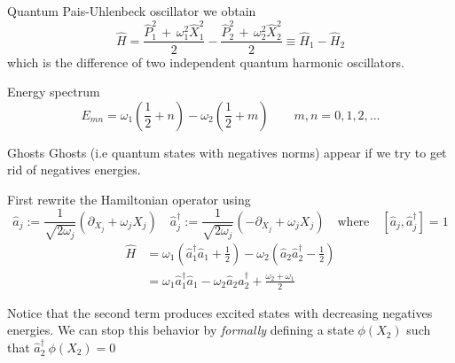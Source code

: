 \begin{frame}{Quantum Pais-Uhlenbeck oscillator}
  we obtain
  \begin{equation*}
    \hat{H} =
    \frac{\hat{P}_1^2 \, + \, \omega_1^2 \hat{X}_1^2}{2} -
    \frac{\hat{P}_2^2 \, + \, \omega_2^2 \hat{X}_2^2}{2} \equiv
    \hat{H}_1 - \hat{H}_2
  \end{equation*}
  which is the difference of two independent quantum harmonic oscillators.
  \vspace{1.5em}
  \begin{block}{Energy spectrum}
    \begin{equation*}
      E_{mn} =
      \omega_1 \left( \frac{1}{2} + n \right) -
      \omega_2 \left( \frac{1}{2} + m \right)
      \qquad m,n = 0,1,2,\ldots
    \end{equation*}
  \end{block}
\end{frame}

\begin{frame}{Ghosts}
  Ghosts (i.e quantum states with negatives norms) appear if we try to get rid
  of negatives energies.

  First rewrite the Hamiltonian operator using
  \begin{equation*}
    \hat{a}_j := \frac{1}{\sqrt{2\omega_j}}
      \left(\partial_{X_j} + \omega_j X_j\right) \quad
    \hat{a}_j^{\dagger} := \frac{1}{\sqrt{2\omega_j}}
      \left(-\partial_{X_j} + \omega_j X_j\right)
    \quad \text{where} \quad
    \left[ \hat{a}_j, \hat{a}_j^{\dagger} \right] = 1
  \end{equation*}
  \begin{align*}
    \hat{H} &=
      \omega_1 \left( \hat{a}_1^{\dagger} \hat{a}_1 + \frac{1}{2} \right) -
      \omega_2 \left( \hat{a}_2 \hat{a}_2^{\dagger} - \frac{1}{2} \right) \\
            &=
      \omega_1 \hat{a}_1^{\dagger} \hat{a}_1 -
      \omega_2 \hat{a}_2 \hat{a}_2^{\dagger} +
      \frac{\omega_2 + \omega_1}{2}
  \end{align*}

  Notice that the second term produces excited states with decreasing negatives
  energies. We can stop this behavior by \emph{formally} defining a state
  $\phi(X_2)$ such that $\hat{a}_2^{\dagger} \ \phi(X_2) = 0$
\end{frame}

